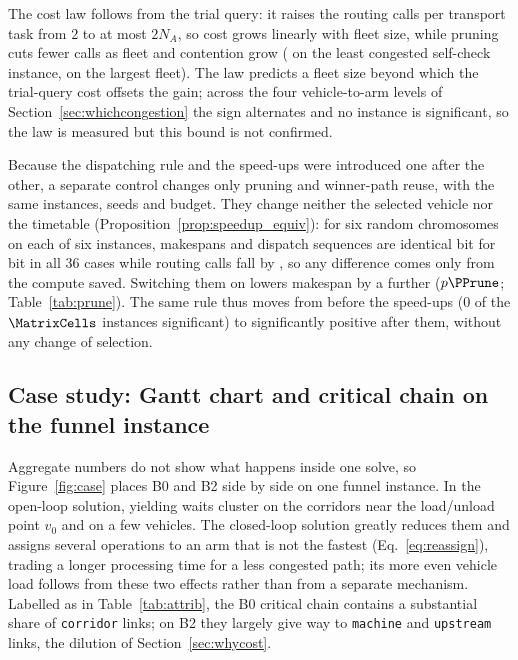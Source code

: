 The cost law follows from the trial query: it raises the routing calls per transport task from $2$ to at most $2N_A$, so cost grows linearly with fleet size, while pruning cuts fewer calls as fleet and contention grow (\RouteCallCutHi{} on the least congested self-check instance, \RouteCallCutLo{} on the largest fleet). The law predicts a fleet size beyond which the trial-query cost offsets the gain; across the four vehicle-to-arm levels of Section~\ref{sec:whichcongestion} the sign alternates and no instance is significant, so the law is measured but this bound is not confirmed.

Because the dispatching rule and the speed-ups were introduced one after the other, a separate control changes only pruning and winner-path reuse, with the same instances, seeds and budget. They change neither the selected vehicle nor the timetable (Proposition~\ref{prop:speedup_equiv}): for six random chromosomes on each of six instances, makespans and dispatch sequences are identical bit for bit in all $36$ cases while routing calls fall by \RouteCallCut{}, so any difference comes only from the compute saved. Switching them on lowers makespan by a further \GainPrune{} ($p\PPrune$; Table~\ref{tab:prune}). The same rule thus moves from \GainProbePre{} before the speed-ups ($0$ of the $\MatrixCells$ instances significant) to significantly positive after them, without any change of selection.

\begin{table}[t]
\caption{Pruning and winner-path reuse off versus on (bold: adopted setting). Same instances, seeds and wall-clock time; $n=60$ pairs, two-sided Wilcoxon signed-rank test ($^{***}p<0.001$). Ratios take the off value as denominator.}
\label{tab:prune}
\small

\end{table}

\subsection{Case study: Gantt chart and critical chain on the funnel instance}
\label{sec:casestudy}

Aggregate numbers do not show what happens inside one solve, so Figure~\ref{fig:case} places B0 and B2 side by side on one funnel instance.
In the open-loop solution, yielding waits cluster on the corridors near the load/unload point $v_0$ and on a few vehicles. The closed-loop solution greatly reduces them and assigns several operations to an arm that is not the fastest (Eq.~\eqref{eq:reassign}), trading a longer processing time for a less congested path; its more even vehicle load follows from these two effects rather than from a separate mechanism.
Labelled as in Table~\ref{tab:attrib}, the B0 critical chain contains a substantial share of \texttt{corridor} links; on B2 they largely give way to \texttt{machine} and \texttt{upstream} links, the dilution of Section~\ref{sec:whycost}.


